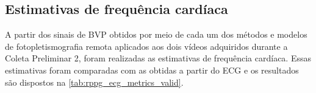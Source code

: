 
\subsection{Estimativas de frequência cardíaca}

A partir dos sinais de BVP obtidos por meio de cada um dos métodos e modelos de fotopletismografia remota aplicados aos dois vídeos adquiridos durante a Coleta Preliminar 2, foram realizadas as estimativas de frequência cardíaca. Essas estimativas foram comparadas com as obtidas a partir do ECG e os resultados são dispostos na \autoref{tab:rppg_ecg_metrics_valid}. 

